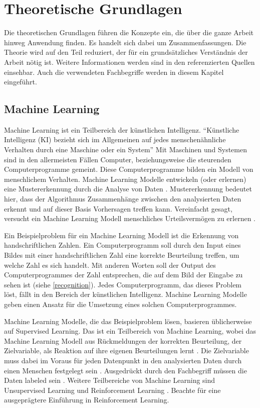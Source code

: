 \chapter{Theoretische Grundlagen}\label{chap:t}
Die theoretischen Grundlagen führen die Konzepte ein, die über die ganze Arbeit
hinweg Anwendung finden. Es handelt sich dabei um Zusammenfassungen. Die Theorie
wird auf den Teil reduziert, der für ein grundsätzliches Verständnis der Arbeit
nötig ist. Weitere Informationen werden sind in den referenzierten Quellen
einsehbar. Auch die verwendeten Fachbegriffe werden in diesem Kapitel
eingeführt. 

\section{Machine Learning}\label{chap:t_ml} Machine Learning ist ein Teilbereich
der künstlichen Intelligenz. ``Künstliche Intelligenz (KI) bezieht sich im
Allgemeinen auf jedes menschenähnliche Verhalten durch eine Maschine oder ein
System'' \cite{noauthor_what_nodate} Mit Maschinen und Systemen sind in den
allermeisten Fällen Computer, beziehungsweise die steurenden Computerprogramme
gemeint. Diese Computerprogramme bilden ein Modell von menschlichem Verhalten.
Machine Learning Modelle entwickeln (oder erlernen) eine Mustererkennung durch
die Analyse von Daten \cite{noauthor_what_nodate-1}. Mustererkennung bedeutet hier,
dass der Algorithmus Zusammenhänge zwischen den analysierten Daten erkennt und
auf dieser Basis Vorhersagen treffen kann. Vereinfacht gesagt, versucht ein
Machine Learning Modell menschliches Urteilsvermögen zu erlernen \cite{spaulding_is_2020}.

Ein Beispielproblem für ein Machine Learning Modell ist die Erkennung von
handschriftlichen Zahlen. Ein Computerprogramm soll durch den Input eines Bildes
mit einer handschriftlichen Zahl eine korrekte Beurteilung treffen, um welche
Zahl es sich handelt. Mit anderen Worten soll der Output des Computerprogrammes
der Zahl entsprechen, die auf dem Bild der Eingabe zu sehen ist (siehe \autoref{recognition}). Jedes %
Computerprogramm, das dieses Problem löst, fällt in den Bereich der künstlichen
Intelligenz. Machine Learning Modelle geben einen Ansatz für die Umsetzung eines
solchen Computerprogrammes.


Machine Learning Modelle, die das Beispielproblem lösen, basieren üblicherweise
auf Supervised Learning. Das ist ein Teilbereich von Machine Learning, wobei das
Machine Learning Modell aus Rückmeldungen der korrekten Beurteilung, der
Zielvariable, als Reaktion auf ihre eigenen Beurteilungen lernt
\cite{noauthor_was_nodate-1}. Die Zielvariable muss dabei im Voraus für jeden
Datenpunkt in den analysierten Daten durch einen Menschen festgelegt sein
\cite{trahasich_31_2020}. Ausgedrückt durch den Fachbegriff müssen die Daten
labeled sein \cite{noauthor_21_nodate}. Weitere Teilbereiche von Machine
Learning sind Unsupervised Learning und Reinforcement Learning
\cite{arora_supervised_2020}. Beachte  für eine ausgeprägtere
Einführung in Reinforcement Learning.

